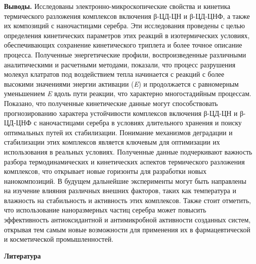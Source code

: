 \begin{multicols}{2}
{\bfseries Выводы.} Исследованы электронно-микроско\-пические свойства и
кинетика термического разложения комплексов включения β-ЦД-ЦН и
β-ЦД-ЦНФ, а также их композиций с наночастицами серебра. Эти
исследования проведены с целью определения кинетических параметров этих
реакций в изотермических условиях, обеспечивающих сохранение
кинетического триплета и более точное описание процесса. Полученные
энергетические профили, воспроизведенные различными аналитическими и
расчетными методами, показали, что процесс разрушения молекул клатратов
под воздействием тепла начинается с реакций с более высокими значениями
энергии активации (\emph{E}) и продолжается с
равномерным уменьшением \emph{E} вдоль пути реакции,
что характерно многостадийным процессам. Показано, что полученные
кинетические данные могут способствовать прогнозированию характера
устойчивости комплексов включения β-ЦД-ЦН и β-ЦД-ЦНФ с наночастицами
серебра в условиях длительного хранения и поиску оптимальных путей их
стабилизации. Понимание механизмов деградации и стабилизации этих
комплексов является ключевым для оптимизации их использования в реальных
условиях. Полученные данные подчеркивают важность разбора
термодинамических и кинетических аспектов термического разложения
комплексов, что открывает новые горизонты для разработки новых
нанокомпозиций. В будущем дальнейшие эксперименты могут быть направлены
на изучение влияния различных внешних факторов, таких как температура и
влажность на стабильность и активность этих комплексов. Также стоит
отметить, что использование наноразмерных частиц серебра может повысить
эффективность антиоксидантной и антимикробной активности созданных
систем, открывая тем самым новые возможности для применения их в
фармацевтической и косметической промышленностей.
\end{multicols}

\begin{center}
{\bfseries Литература}
\end{center}

